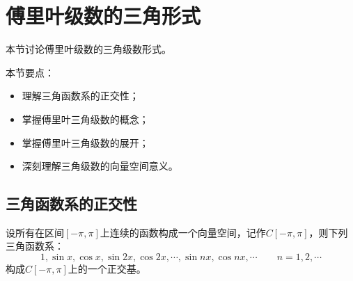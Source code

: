 \section{傅里叶级数的三角形式}

本节讨论傅里叶级数的三角级数形式。

本节要点：
\begin{itemize}
    \item 理解三角函数系的正交性；
    \item 掌握傅里叶三角级数的概念；
    \item 掌握傅里叶三角级数的展开；
    \item 深刻理解三角级数的向量空间意义。
\end{itemize}

\subsection{三角函数系的正交性}

\begin{theorem}[三角函数系正交性定理]
设所有在区间$\left[ -\pi ,\pi \right] $上连续的函数构成一个向量空间，记作$C\left[ -\pi ,\pi \right] $，则下列三角函数系：
\[
1,\sin x,\cos x,\sin 2x,\cos 2x,\cdots ,\sin nx,\cos nx,\cdots \qquad n=1,2,\cdots
\]
构成$C\left[ -\pi ,\pi \right] $上的一个正交基。
\end{theorem}

